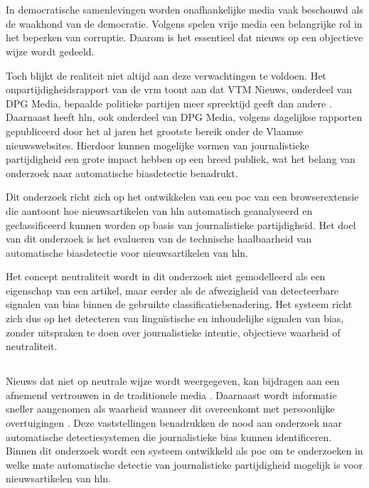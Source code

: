 \chapter{}
\label{ch:inleiding}

In democratische samenlevingen worden onafhankelijke media vaak beschouwd als de waakhond van de democratie. Volgens \textcite{Starke2016} spelen vrije media een belangrijke rol in het beperken van corruptie. Daarom is het essentieel dat nieuws op een objectieve wijze wordt gedeeld.

Toch blijkt de realiteit niet altijd aan deze verwachtingen te voldoen. Het onpartijdigheidsrapport van de \gls{vrm} toont aan dat VTM Nieuws, onderdeel van DPG Media, bepaalde politieke partijen meer spreektijd geeft dan andere \autocite{VanAelst2024}. Daarnaast heeft \gls{hln}, ook onderdeel van DPG Media, volgens dagelijkse rapporten gepubliceerd door het \textcite{CIM2025} al jaren het grootste bereik onder de Vlaamse nieuwswebsites. Hierdoor kunnen mogelijke vormen van journalistieke partijdigheid een grote impact hebben op een breed publiek, wat het belang van onderzoek naar automatische biasdetectie benadrukt.

Dit onderzoek richt zich op het ontwikkelen van een \gls{poc} van een browserextensie die aantoont hoe nieuwsartikelen van \gls{hln} automatisch geanalyseerd en geclassificeerd kunnen worden op basis van journalistieke partijdigheid. Het doel van dit onderzoek is het evalueren van de technische haalbaarheid van automatische biasdetectie voor nieuwsartikelen van \gls{hln}.

Het concept neutraliteit wordt in dit onderzoek niet gemodelleerd als een eigenschap van een artikel, maar eerder als de afwezigheid van detecteerbare signalen van bias binnen de gebruikte classificatiebenadering. Het systeem richt zich dus op het detecteren van linguïstische en inhoudelijke signalen van bias, zonder uitspraken te doen over journalistieke intentie, objectieve waarheid of neutraliteit.

\section{}
\label{sec:probleemstelling}

Nieuws dat niet op neutrale wijze wordt weergegeven, kan bijdragen aan een afnemend vertrouwen in de traditionele media \autocite{Hanjia2024}. Daarnaast wordt informatie sneller aangenomen als waarheid wanneer dit overeenkomt met persoonlijke overtuigingen \autocite{Schwalbe2024}. Deze vaststellingen benadrukken de nood aan onderzoek naar automatische detectiesystemen die journalistieke bias kunnen identificeren. Binnen dit onderzoek wordt een systeem ontwikkeld als \gls{poc} om te onderzoeken in welke mate automatische detectie van journalistieke partijdigheid mogelijk is voor nieuwsartikelen van \gls{hln}.

